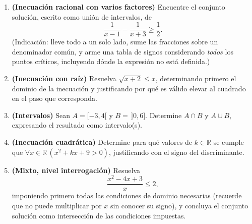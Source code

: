 \documentclass[11pt]{article}
\begin{document}
\begin{enumerate}
    \item \textbf{(Inecuación racional con varios factores)} Encuentre el conjunto solución,
    escrito como unión de intervalos, de
    $$\frac{1}{x-1} - \frac{1}{x+3} \ge \frac{1}{2}.$$
    (Indicación: lleve todo a un solo lado, sume las fracciones sobre un denominador común, y
    arme una tabla de signos considerando \emph{todos} los puntos críticos, incluyendo dónde la
    expresión no está definida.)

    \item \textbf{(Inecuación con raíz)} Resuelva $\sqrt{x+2} \le x$, determinando primero el
    dominio de la inecuación y justificando por qué es válido elevar al cuadrado en el paso que
    corresponda.

    \item \textbf{(Intervalos)} Sean $A = [-3,4[$ y $B = \,]0,6]$. Determine $A \cap B$ y
    $A \cup B$, expresando el resultado como intervalo(s).

    \item \textbf{(Inecuación cuadrática)} Determine para qué valores de $k \in \mathbb{R}$ se
    cumple que $\forall x \in \mathbb{R}\,(x^2 + kx + 9 > 0)$, justificando con el signo del
    discriminante.

    \item \textbf{(Mixto, nivel interrogación)} Resuelva
    $$\frac{x^2-4x+3}{x} \le 2,$$
    imponiendo primero todas las condiciones de dominio necesarias (recuerde que no puede
    multiplicar por $x$ sin conocer su signo), y concluya el conjunto solución como intersección
    de las condiciones impuestas.
\end{enumerate}
\end{document}
